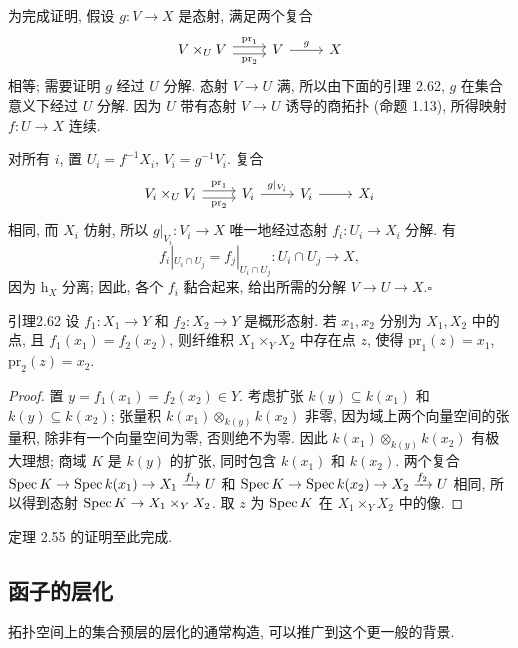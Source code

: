 为完成证明, 假设 $g:V\to X$ 是态射, 满足两个复合
\[
\begin{tikzcd}
V\times_UV\arrow[r,shift left=.6ex,"\mathrm{pr}_1"]\arrow[r,shift right=.6ex,"\mathrm{pr}_2"']&V\arrow[r,"g"]&X
\end{tikzcd}
\]
相等; 需要证明 $g$ 经过 $U$ 分解. 态射 $V\to U$ 满, 所以由下面的引理 2.62, $g$ 在集合意义下经过 $U$ 分解. 因为 $U$ 带有态射 $V\to U$ 诱导的商拓扑 (命题 1.13), 所得映射 $f:U\to X$ 连续.

对所有 $i$, 置 $U_i=f^{-1}X_i$, $V_i=g^{-1}V_i$. 复合
\[
\begin{tikzcd}
V_i\times_UV_i\arrow[r,shift left=.6ex,"\mathrm{pr}_1"]\arrow[r,shift right=.6ex,"\mathrm{pr}_2"']&V_i\arrow[r,"g|_{V_i}"]&V_i\arrow[r]&X_i
\end{tikzcd}
\]
相同, 而 $X_i$ 仿射, 所以 $g|_{V_i}:V_i\to X$ 唯一地经过态射 $f_i:U_i\to X_i$ 分解. 有
\[
f_i|_{U_i\cap U_j}=f_j|_{U_i\cap U_j}:U_i\cap U_j\longrightarrow X,
\]
因为 $\mathrm h_X$ 分离; 因此, 各个 $f_i$ 黏合起来, 给出所需的分解 $V\to U\to X$.\hfill$\square$

\begin{origstatement}{引理}{2.62}\label{ch02:lem262}
设 $f_1:X_1\to Y$ 和 $f_2:X_2\to Y$ 是概形态射. 若 $x_1,x_2$ 分别为 $X_1,X_2$ 中的点, 且 $f_1(x_1)=f_2(x_2)$, 则纤维积 $X_1\times_YX_2$ 中存在点 $z$, 使得 $\mathrm{pr}_1(z)=x_1$, $\mathrm{pr}_2(z)=x_2$.
\end{origstatement}
\begin{proof}
置 $y=f_1(x_1)=f_2(x_2)\in Y$. 考虑扩张 $k(y)\subseteq k(x_1)$ 和 $k(y)\subseteq k(x_2)$; 张量积 $k(x_1)\otimes_{k(y)}k(x_2)$ 非零, 因为域上两个向量空间的张量积, 除非有一个向量空间为零, 否则绝不为零. 因此 $k(x_1)\otimes_{k(y)}k(x_2)$ 有极大理想; 商域 $K$ 是 $k(y)$ 的扩张, 同时包含 $k(x_1)$ 和 $k(x_2)$. 两个复合 $\operatorname{Spec} K\to\operatorname{Spec} k(x_1)\to X_1\xrightarrow{f_1}U$ 和 $\operatorname{Spec} K\to\operatorname{Spec} k(x_2)\to X_2\xrightarrow{f_2}U$ 相同, 所以得到态射 $\operatorname{Spec} K\to X_1\times_YX_2$. 取 $z$ 为 $\operatorname{Spec} K$ 在 $X_1\times_YX_2$ 中的像.
\end{proof}

定理 2.55 的证明至此完成.

\subsection{函子的层化}\label{ch02:sec237}
拓扑空间上的集合预层的层化的通常构造, 可以推广到这个更一般的背景.

